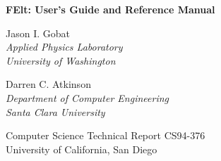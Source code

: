 

\newpage{\pagestyle{empty}\cleardoublepage}
\setcounter{page}{1}

\thispagestyle{empty}

\noindent
\LARGE{\bf FElt: User's Guide and Reference Manual}

\vspace{1in}\noindent
\Large{Jason I. Gobat}\\
\large{\it Applied Physics Laboratory}\\
\large{\it University of Washington} 

\vspace{0.5in}\noindent
\Large{Darren C. Atkinson}\\
\large{\it Department of Computer Engineering}\\
\large{\it Santa Clara University}

\vspace{4in}\noindent
\Large{Computer Science Technical Report CS94-376}\\
\large{University of California, San Diego}

